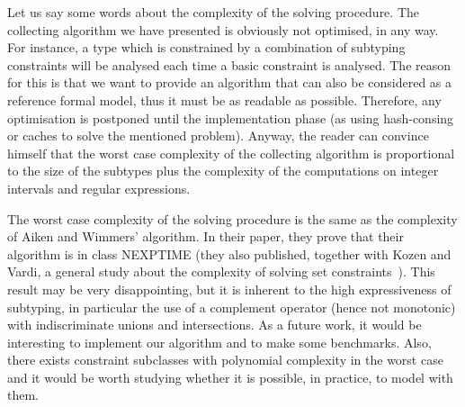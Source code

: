 Let us say some words about the complexity of the solving
procedure. The collecting algorithm we have presented is obviously not
optimised, in any way. For instance, a type which is constrained by a
combination of subtyping constraints will be analysed each time a
basic constraint is analysed. The reason for this is that we want to
provide an algorithm that can also be considered as a reference formal
model, thus it must be as readable as possible. Therefore, any
optimisation is postponed until the implementation phase (as using
hash-consing or caches to solve the mentioned problem). Anyway, the
reader can convince himself that the worst case complexity of the
collecting algorithm is proportional to the size of the subtypes plus
the complexity of the computations on integer intervals and regular
expressions.

The worst case complexity of the solving procedure is the same as the
complexity of Aiken and Wimmers' algorithm. In their paper, they prove
that their algorithm is in class NEXPTIME (they also published,
together with Kozen and Vardi, a general study about the complexity of
solving set constraints~\cite{AikenKozenVardiWimmers:1993}). This
result may be very disappointing, but it is inherent to the high
expressiveness of \ASN subtyping, in particular the use of a
complement operator (hence not monotonic) with indiscriminate unions
and intersections. As a future work, it would be interesting to
implement our algorithm and to make some benchmarks. Also, there
exists constraint subclasses with polynomial complexity in the
worst case and it would be worth studying whether it is possible, in
practice, to model \ASN with them.
